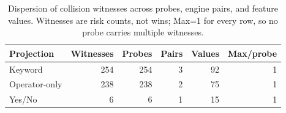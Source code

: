 \begin{table}[t]
\centering
\footnotesize
\caption{Dispersion of collision witnesses across probes, engine pairs, and feature values.  Witnesses are risk counts, not wins; Max=1 for every row, so no probe carries multiple witnesses.}
\label{tab:witness-dispersion}
\setlength{\tabcolsep}{3pt}
\begin{tabular}{@{}lrrrrr@{}}
\toprule
Projection & Witnesses & Probes & Pairs & Values & Max/probe \\
\midrule
Keyword & 254 & 254 & 3 & 92 & 1 \\
Operator-only & 238 & 238 & 2 & 75 & 1 \\
Yes/No & 6 & 6 & 1 & 15 & 1 \\
\bottomrule
\end{tabular}
\end{table}
